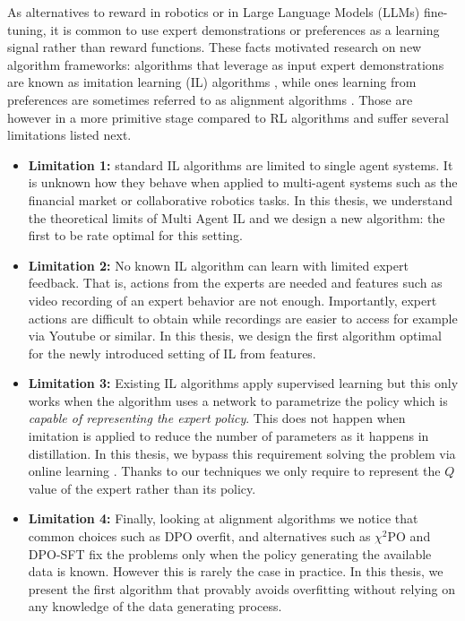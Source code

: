 \documentclass{article}
\begin{document}
As alternatives to reward in robotics or in Large Language Models (LLMs) fine-tuning, it is common to use expert demonstrations \citep{Osa:2018} or preferences \citep{ouyang2022training,christiano2017deep} as a learning signal rather than reward functions.
These facts motivated research on new algorithm frameworks: algorithms that leverage as input expert demonstrations are known as imitation learning (IL) algorithms \citep{Osa:2018}, while ones learning from preferences are sometimes referred to as alignment algorithms \citep{ouyang2022training}.  
Those are however in a more primitive stage compared to RL algorithms and suffer several limitations listed next.
\begin{itemize}
\item \textbf{Limitation 1:} standard IL algorithms are limited to single agent systems. It is unknown how they behave when applied to multi-agent systems such as the financial market or collaborative robotics tasks.
In this thesis, we understand the theoretical limits of Multi Agent IL and we design a new algorithm: the first to be rate optimal for this setting.
\item \textbf{Limitation 2:} No known IL algorithm can learn with limited expert feedback. That is, actions from the experts are needed and features such as video recording of an expert behavior are not enough.
Importantly, expert actions are difficult to obtain while recordings are easier to access for example via Youtube or similar. In this thesis, we design the first algorithm optimal for the 
newly introduced setting of IL from features.
\item \textbf{Limitation 3:} Existing IL algorithms apply supervised learning but this only works when the algorithm uses a network
 to parametrize the policy which is \emph{capable of representing the expert policy}. This does not happen when imitation is applied to reduce the number of parameters as it happens in distillation. 
 In this thesis, we bypass this requirement solving the problem via online learning \citep{Cesa-Bianchi:2006}. Thanks to our techniques we only require to represent the $Q$ value of the expert rather than its policy.
 \item \textbf{Limitation 4:} Finally, looking at alignment algorithms we notice that common choices such as DPO overfit, and alternatives such as $\chi^2$PO and DPO-SFT fix the problems only when the
 policy generating the available data is known. However this is rarely the case in practice. In this thesis, we present the first algorithm that
 provably avoids overfitting without relying on any knowledge of the data generating process.
\end{itemize}
\end{document}

